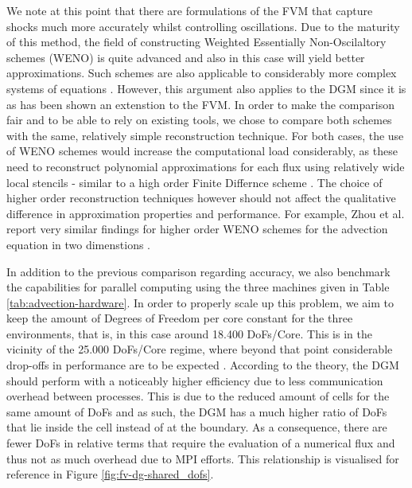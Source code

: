 \documentclass[sn-mathphys,Numbered]{sn-jnl}%
\theoremstyle{thmstyleone}%
\theoremstyle{thmstyletwo}%
\theoremstyle{thmstylethree}%
\begin{document}
We note at this point that there are formulations of the FVM that capture shocks much more accurately whilst controlling oscillations.
Due to the maturity of this method, the field of constructing Weighted Essentially Non-Oscilaltory schemes (WENO) is quite advanced and also in this case will yield better approximations.
Such schemes are also applicable to considerably more complex systems of equations \cite{zimbrodEfficientSimulationComplex2022}.
However, this argument also applies to the DGM since it is as has been shown an extenstion to the FVM.
In order to make the comparison fair and to be able to rely on existing tools, we chose to compare both schemes with the same, relatively simple reconstruction technique.
For both cases, the use of WENO schemes would increase the computational load considerably, as these need to reconstruct polynomial approximations for each flux using relatively wide local stencils - similar to a high order Finite Differnce scheme \cite{liuRobustReconstructionUnstructured2013}.
The choice of higher order reconstruction techniques however should not affect the qualitative difference in approximation properties and performance.
For example, Zhou et al. report very similar findings for higher order WENO schemes for the advection equation in two dimenstions \cite{zhouNumericalComparisonWENO2001}.

In addition to the previous comparison regarding accuracy, we also benchmark the capabilities for parallel computing using the three machines given in Table \ref{tab:advection-hardware}.
In order to properly scale up this problem, we aim to keep the amount of Degrees of Freedom per core constant for the three environments, that is,  in this case around 18.400 DoFs/Core.
This is in the vicinity of the 25.000 DoFs/Core regime, where beyond that point considerable drop-offs in performance are to be expected \cite{badiaGenericFiniteElement2020}.
According to the theory, the DGM should perform with a noticeably higher efficiency due to less communication overhead between processes.
This is due to the reduced amount of cells for the same amount of DoFs and as such, the DGM has a much higher ratio of DoFs that lie inside the cell instead of at the boundary. 
As a consequence, there are fewer DoFs in relative terms that require the evaluation of a numerical flux and thus not as much overhead due to MPI efforts.
This relationship is visualised for reference in Figure \ref{fig:fv-dg-shared_dofs}.
\end{document}
